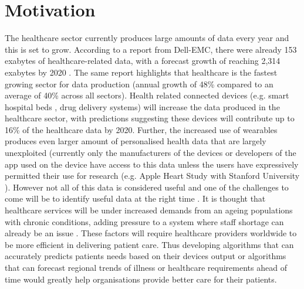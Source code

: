 \section{Motivation}
The healthcare sector currently produces large amounts of data every year and this is set to grow.  According to a report from Dell-EMC, there were already 153 exabytes of healthcare-related data, with a forecast growth of reaching 2,314 exabytes by 2020 \citep{EMC:2014ve}. The same report highlights that healthcare is the fastest growing sector for data production (annual growth of 48\% compared to an average of 40\% across all sectors). Health related connected devices (e.g. smart hospital beds , drug delivery systems) will increase the data produced in the healthcare sector, with predictions suggesting these devices will contribute up to 16\% of the healthcare data by 2020.\newline
Further, the increased use of wearables produces even larger amount of personalised health data that are largely unexploited (currently only the manufacturers of the devices or developers of the app used on the device have access to this data unless the users have expressively permitted their use for research (e.g. Apple Heart Study with Stanford University \citep{Anonymous:I2FTN6O4, Medicine:2017wa}). However not all of this data is considered useful and one of the challenges to come will be to identify useful data at the right time \citep{EMC:2014ve}.\newline
It is thought that healthcare services will be under increased demands from an ageing populations with chronic conditions, adding pressure to a system where staff shortage can already be an issue \citep{Medicine:2017wa}. These factors will require healthcare providers worldwide to be more efficient in delivering patient care. Thus developing algorithms that can accurately predicts patients needs based on their devices output or algorithms that can forecast regional trends of illness or healthcare requirements ahead of time would greatly help organisations provide better care for their patients. \newline

